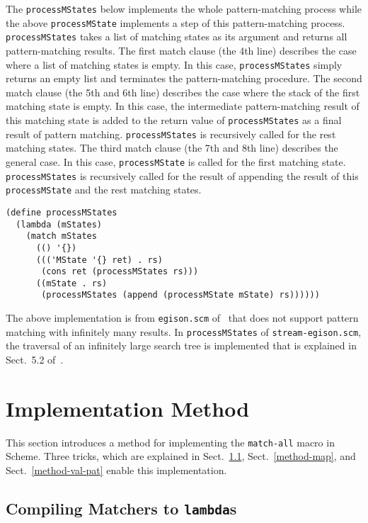\documentclass[acmlarge]{acmart}
\begin{document}
The \texttt{processMStates} below implements the whole pattern-matching process while the above \texttt{processMState} implements a step of this pattern-matching process.
\texttt{processMStates} takes a list of matching states as its argument and returns all pattern-matching results.
The first match clause (the 4th line) describes the case where a list of matching states is empty.
In this case, \texttt{processMStates} simply returns an empty list and terminates the pattern-matching procedure.
The second match clause (the 5th and 6th line) describes the case where the stack of the first matching state is empty.
In this case, the intermediate pattern-matching result of this matching state is added to the return value of \texttt{processMStates} as a final result of pattern matching.
\texttt{processMStates} is recursively called for the rest matching states.
The third match clause (the 7th and 8th line) describes the general case.
In this case, \texttt{processMState} is called for the first matching state.
\texttt{processMStates} is recursively called for the result of appending the result of this \texttt{processMState} and the rest matching states.

\begin{lstlisting}[language=egison]
(define processMStates
  (lambda (mStates)
    (match mStates
      (() '{})
      ((('MState '{} ret) . rs)
       (cons ret (processMStates rs)))
      ((mState . rs)
       (processMStates (append (processMState mState) rs))))))
\end{lstlisting}

The above implementation is from \texttt{egison.scm} of~\cite{egisonScheme} that does not support pattern matching with infinitely many results.
In \texttt{processMStates} of \texttt{stream-egison.scm}, the traversal of an infinitely large search tree is implemented that is explained in Sect.~5.2 of~\cite{egi2018aplas}.

\section{Implementation Method}\label{method}

This section introduces a method for implementing the \texttt{match-all} macro in Scheme.
Three tricks, which are explained in Sect.~\ref{method-matcher}, Sect.~\ref{method-map}, and Sect.~\ref{method-val-pat} enable this implementation.

\subsection{Compiling Matchers to \texttt{lambda}s}\label{method-matcher}
\end{document}
